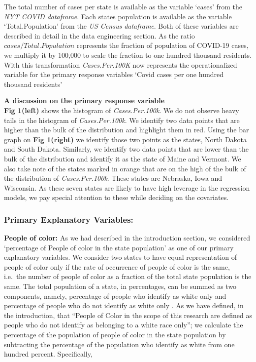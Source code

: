 \documentclass[
]{article}
\begin{document}
The total number of cases per state is available as the variable `cases'
from the \emph{NYT COVID dataframe}. Each states population is available
as the variable `Total.Population' from the \emph{US Census dataframe}.
Both of these variables are described in detail in the data engineering
section. As the ratio \(cases/Total.Population\) represents the fraction
of population of COVID-19 cases, we multiply it by 100,000 to scale the
fraction to one hundred thousand residents. With this transformation
\emph{Cases.Per.100K} now represents the operationalized variable for
the primary response variables `Covid cases per one hundred thousand
residents'

\textbf{A discussion on the primary response variable}\\
\textbf{Fig 1(left)} shows the histogram of \emph{Cases.Per.100k}. We do
not observe heavy tails in the histogram of \emph{Cases.Per.100k}. We
identify two data points that are higher than the bulk of the
distribution and highlight them in red. Using the bar graph on
\textbf{Fig 1(right)} we identify those two points as the states, North
Dakota and South Dakota. Similarly, we identify two data points that are
lower than the bulk of the distribution and identify it as the state of
Maine and Vermont. We also take note of the states marked in orange that
are on the high of the bulk of the distribution of
\emph{Cases.Per.100k}. These states are Nebraska, Iowa and Wisconsin. As
these seven states are likely to have high leverage in the regression
models, we pay special attention to these while deciding on the
covariates.

\hypertarget{primary-explanatory-variables}{%
\subsubsection{Primary Explanatory
Variables:}\label{primary-explanatory-variables}}

\textbf{People of color:} As we had described in the introduction
section, we considered `percentage of People of color in the state
population' as one of our primary explanatory variables. We consider two
states to have equal representation of people of color only if the rate
of occurrence of people of color is the same, i.e.~the number of people
of color as a fraction of the total state population is the same. The
total population of a state, in percentages, can be summed as two
components, namely, percentage of people who identify as white only and
percentage of people who do not identify as white only . As we have
defined, in the introduction, that ``People of Color in the scope of
this research are defined as people who do not identify as belonging to
a white race only''; we calculate the percentage of the population of
people of color in the state population by subtracting the percentage of
the population who identify as white from one hundred percent.
Specifically,
\end{document}
